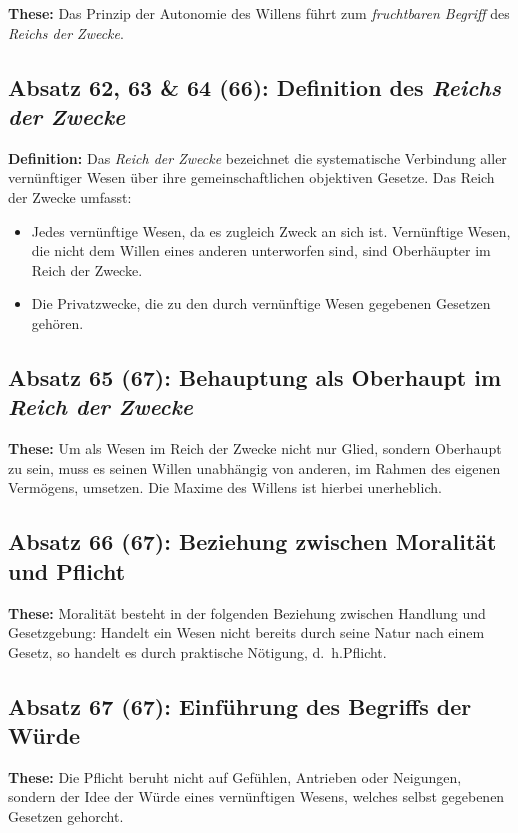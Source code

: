 \documentclass{llncs}
\begin{document}
\textbf{These:} Das Prinzip der Autonomie des Willens führt zum \textit{fruchtbaren Begriff} des \textit{Reichs der Zwecke}.

\subsection*{Absatz 62, 63 \& 64 (66): Definition des \textit{Reichs der Zwecke}}

\textbf{Definition:} Das \textit{Reich der Zwecke} bezeichnet die systematische Verbindung aller vernünftiger Wesen über ihre gemeinschaftlichen objektiven Gesetze.
Das Reich der Zwecke umfasst:
\begin{itemize}
	\item Jedes vernünftige Wesen, da es zugleich Zweck an sich ist. Vernünftige Wesen, die nicht dem Willen eines anderen unterworfen sind, sind Oberhäupter im Reich der Zwecke.
	\item Die Privatzwecke, die zu den durch vernünftige Wesen gegebenen Gesetzen gehören.
\end{itemize}

\subsection*{Absatz 65 (67): Behauptung als Oberhaupt im \textit{Reich der Zwecke}}

\textbf{These:} Um als Wesen im Reich der Zwecke nicht nur Glied, sondern Oberhaupt zu sein, muss es seinen Willen unabhängig von anderen, im Rahmen des eigenen Vermögens, umsetzen.
Die Maxime des Willens ist hierbei unerheblich.

\subsection*{Absatz 66 (67): Beziehung zwischen Moralität und Pflicht}

\textbf{These:} Moralität besteht in der folgenden Beziehung zwischen Handlung und Gesetzgebung:
Handelt ein Wesen nicht bereits durch seine Natur nach einem Gesetz, so handelt es durch praktische Nötigung, d.~h.\@ Pflicht.

\subsection*{Absatz 67 (67): Einführung des Begriffs der Würde}

\textbf{These:} Die Pflicht beruht nicht auf Gefühlen, Antrieben oder Neigungen, sondern der Idee der Würde eines vernünftigen Wesens, welches selbst gegebenen Gesetzen gehorcht.
\end{document}
